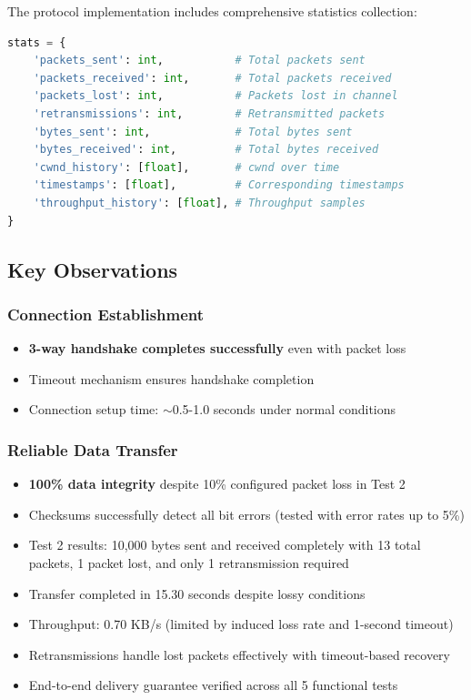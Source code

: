 \documentclass[11pt,a4paper]{article}
\begin{document}
The protocol implementation includes comprehensive statistics collection:

\begin{lstlisting}[language=Python]
stats = {
    'packets_sent': int,           # Total packets sent
    'packets_received': int,       # Total packets received
    'packets_lost': int,           # Packets lost in channel
    'retransmissions': int,        # Retransmitted packets
    'bytes_sent': int,             # Total bytes sent
    'bytes_received': int,         # Total bytes received
    'cwnd_history': [float],       # cwnd over time
    'timestamps': [float],         # Corresponding timestamps
    'throughput_history': [float], # Throughput samples
}
\end{lstlisting}

\subsection{Key Observations}

\subsubsection{Connection Establishment}
\begin{itemize}
    \item \textbf{3-way handshake completes successfully} even with packet loss
    \item Timeout mechanism ensures handshake completion
    \item Connection setup time: $\sim$0.5-1.0 seconds under normal conditions
\end{itemize}

\subsubsection{Reliable Data Transfer}
\begin{itemize}
    \item \textbf{100\% data integrity} despite 10\% configured packet loss in Test 2
    \item Checksums successfully detect all bit errors (tested with error rates up to 5\%)
    \item Test 2 results: 10,000 bytes sent and received completely with 13 total packets, 1 packet lost, and only 1 retransmission required
    \item Transfer completed in 15.30 seconds despite lossy conditions
    \item Throughput: 0.70 KB/s (limited by induced loss rate and 1-second timeout)
    \item Retransmissions handle lost packets effectively with timeout-based recovery
    \item End-to-end delivery guarantee verified across all 5 functional tests
\end{itemize}
\end{document}
